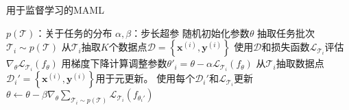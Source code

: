 \documentclass[11pt,twoside,a4paper]{ctexart}
\begin{document}
	\begin{algorithm}
		\caption{用于监督学习的MAML}
		\label{alg2}
		\begin{algorithmic}[1]
			\Require $p(\mathcal T)$：关于任务的分布
			\Require $\alpha,\beta$：步长超参
			\State 随机初始化参数$\theta$
			\State 抽取任务批次$\mathcal T_i \sim p(\mathcal T)$
			\State 从$\mathcal{T}_i$抽取$K$个数据点$\mathcal D=\left\{\mathbf{x}^{(i)},\mathbf{y}^{(i)}\right\}$
			\State 使用$\mathcal D$和损失函数$\mathcal{L}_{\mathcal{T}_i}$评估$\nabla_\theta\mathcal L_{\mathcal T_i}\left( f_\theta \right)$
			\State 用梯度下降计算调整参数$\theta'_i=\theta-\alpha\mathcal{L}_{\mathcal{T}_i}\left( f_\theta \right)$
			\State 从$\mathcal{T}_i$抽取数据点$\mathcal D_i'=\left\{\mathbf{x}^{(i)},\mathbf{y}^{(i)}\right\}$用于元更新。
			\EndFor
			\State 使用每个$\mathcal D_i'$和$\mathcal{L}_{\mathcal{T}_i}$更新$\theta \gets \theta - \beta\nabla_\theta\sum_{\mathcal{T}_i\sim p(\mathcal{T})}\mathcal{L}_{\mathcal{T}_i}\left( f_{\theta_i'}\right)$
			\EndWhile
		\end{algorithmic}
	\end{algorithm}
	
	\clearpage
\end{document}
